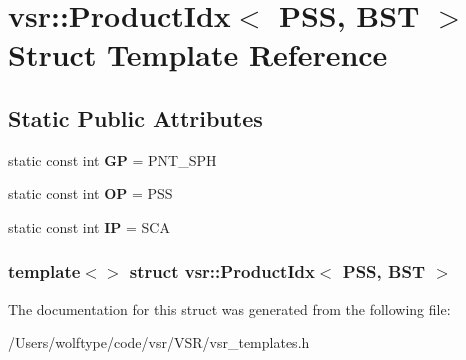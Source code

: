 \hypertarget{structvsr_1_1_product_idx_3_01_p_s_s_00_01_b_s_t_01_4}{\section{vsr\-:\-:Product\-Idx$<$ P\-S\-S, B\-S\-T $>$ Struct Template Reference}
\label{structvsr_1_1_product_idx_3_01_p_s_s_00_01_b_s_t_01_4}
}
\subsection*{Static Public Attributes}
\begin{DoxyCompactItemize}
\item 
\hypertarget{structvsr_1_1_product_idx_3_01_p_s_s_00_01_b_s_t_01_4_a07ae30fcbbef5593d20f165578496604}{static const int {\bfseries G\-P} = P\-N\-T\-\_\-\-S\-P\-H}\label{structvsr_1_1_product_idx_3_01_p_s_s_00_01_b_s_t_01_4_a07ae30fcbbef5593d20f165578496604}

\item 
\hypertarget{structvsr_1_1_product_idx_3_01_p_s_s_00_01_b_s_t_01_4_a8079f32d3bf87f8ba98bd27823146571}{static const int {\bfseries O\-P} = P\-S\-S}\label{structvsr_1_1_product_idx_3_01_p_s_s_00_01_b_s_t_01_4_a8079f32d3bf87f8ba98bd27823146571}

\item 
\hypertarget{structvsr_1_1_product_idx_3_01_p_s_s_00_01_b_s_t_01_4_a3b22b5803b2c85077a3eb681c127130d}{static const int {\bfseries I\-P} = S\-C\-A}\label{structvsr_1_1_product_idx_3_01_p_s_s_00_01_b_s_t_01_4_a3b22b5803b2c85077a3eb681c127130d}

\end{DoxyCompactItemize}
\subsubsection*{template$<$$>$ struct vsr\-::\-Product\-Idx$<$ P\-S\-S, B\-S\-T $>$}



The documentation for this struct was generated from the following file\-:\begin{DoxyCompactItemize}
\item 
/\-Users/wolftype/code/vsr/\-V\-S\-R/vsr\-\_\-templates.\-h\end{DoxyCompactItemize}
